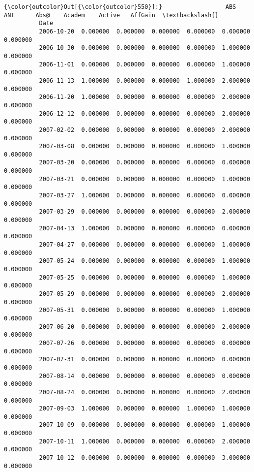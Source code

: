 \documentclass[11pt]{article}
\begin{document}
\begin{Verbatim}[commandchars=\\\{\}]
{\color{outcolor}Out[{\color{outcolor}550}]:}                  ABS       ANI      Abs@    Academ    Active   AffGain  \textbackslash{}
          Date                                                                     
          2006-10-20  0.000000  0.000000  0.000000  0.000000  0.000000  0.000000   
          2006-10-30  0.000000  0.000000  0.000000  0.000000  1.000000  0.000000   
          2006-11-01  0.000000  0.000000  0.000000  0.000000  1.000000  0.000000   
          2006-11-13  1.000000  0.000000  0.000000  1.000000  2.000000  0.000000   
          2006-11-20  1.000000  0.000000  0.000000  0.000000  2.000000  0.000000   
          2006-12-12  0.000000  0.000000  0.000000  0.000000  2.000000  0.000000   
          2007-02-02  0.000000  0.000000  0.000000  0.000000  2.000000  0.000000   
          2007-03-08  0.000000  0.000000  0.000000  0.000000  1.000000  0.000000   
          2007-03-20  0.000000  0.000000  0.000000  0.000000  0.000000  0.000000   
          2007-03-21  0.000000  0.000000  0.000000  0.000000  1.000000  0.000000   
          2007-03-27  1.000000  0.000000  0.000000  0.000000  0.000000  0.000000   
          2007-03-29  0.000000  0.000000  0.000000  0.000000  2.000000  0.000000   
          2007-04-13  1.000000  0.000000  0.000000  0.000000  0.000000  0.000000   
          2007-04-27  0.000000  0.000000  0.000000  0.000000  1.000000  0.000000   
          2007-05-24  0.000000  0.000000  0.000000  0.000000  1.000000  0.000000   
          2007-05-25  0.000000  0.000000  0.000000  0.000000  1.000000  0.000000   
          2007-05-29  0.000000  0.000000  0.000000  0.000000  2.000000  0.000000   
          2007-05-31  0.000000  0.000000  0.000000  0.000000  1.000000  0.000000   
          2007-06-20  0.000000  0.000000  0.000000  0.000000  2.000000  0.000000   
          2007-07-26  0.000000  0.000000  0.000000  0.000000  0.000000  0.000000   
          2007-07-31  0.000000  0.000000  0.000000  0.000000  0.000000  0.000000   
          2007-08-14  0.000000  0.000000  0.000000  0.000000  0.000000  0.000000   
          2007-08-24  0.000000  0.000000  0.000000  0.000000  2.000000  0.000000   
          2007-09-03  1.000000  0.000000  0.000000  1.000000  1.000000  0.000000   
          2007-10-09  0.000000  0.000000  0.000000  0.000000  1.000000  0.000000   
          2007-10-11  1.000000  0.000000  0.000000  0.000000  2.000000  0.000000   
          2007-10-12  0.000000  0.000000  0.000000  0.000000  3.000000  0.000000   

\end{Verbatim}
\end{document}
